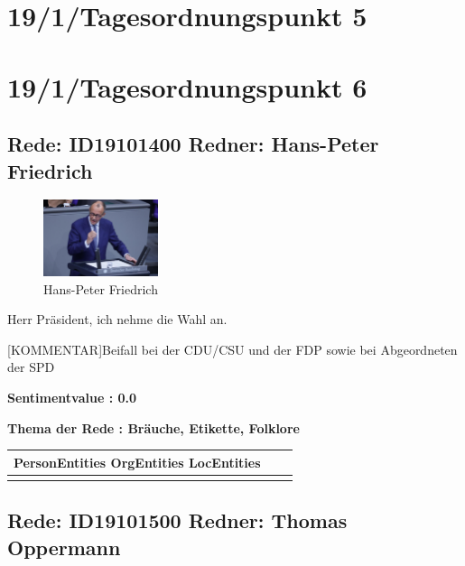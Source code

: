 \documentclass[a4paper,11pt]{article}
\begin{document}
\section{19/1/Tagesordnungspunkt 5} 

\section{19/1/Tagesordnungspunkt 6} 

\subsection{Rede: ID19101400  Redner: Hans-Peter Friedrich}

\begin{figure}[ht]

\centering

\includegraphics[width=0.3\textwidth]{Hans-Peter_Friedrich.jpg}

\caption{Hans-Peter Friedrich}

\end{figure}

Herr Präsident, ich nehme die Wahl an.

[KOMMENTAR]Beifall bei der CDU/CSU und der FDP sowie bei Abgeordneten der SPD


\textbf{Sentimentvalue : 0.0}

\textbf{Thema der Rede : Bräuche, Etikette, Folklore}
\vspace*{1cm}

\begin{table}[ht]
\centering
\begin{tabular}{||c | c | c||}
\hline
PersonEntities  OrgEntities  LocEntities \\ 

\hline\hline
\makecell{} 
\makecell{} 
\makecell{}\\
\hline
\end{tabular}
\end{table}
\clearpage


\subsection{Rede: ID19101500  Redner: Thomas Oppermann}
\end{document}
